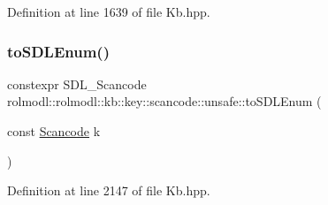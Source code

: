 Definition at line 1639 of file Kb.\+hpp.

\mbox{\label{namespacerolmodl_1_1rolmodl_1_1kb_1_1key_1_1scancode_1_1unsafe_afc37d74911e58f49897608a464f0fe6e}} 
\subsubsection{\texorpdfstring{toSDLEnum()}{toSDLEnum()}}
{\footnotesize\ttfamily constexpr S\+D\+L\+\_\+\+Scancode rolmodl\+::rolmodl\+::kb\+::key\+::scancode\+::unsafe\+::to\+S\+D\+L\+Enum (\begin{DoxyParamCaption}\item[{const \mbox{\hyperlink{namespacerolmodl_1_1rolmodl_1_1kb_1_1key_af2e2c19a7e4c7347383cae496d850490}{Scancode}}}]{k }\end{DoxyParamCaption})\hspace{0.3cm}{\ttfamily [noexcept]}}



Definition at line 2147 of file Kb.\+hpp.


